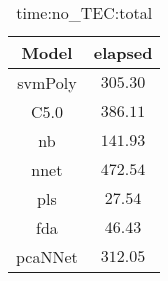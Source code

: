 \begin{table}[!ht]
	\centering
	\begin{tabular}{|c|c|}
		\hline
		Model & elapsed \\ \hline
		svmPoly & $305.30$ \\ \hline
		C5.0 & $386.11$ \\ \hline
		nb & $141.93$ \\ \hline
		nnet & $472.54$ \\ \hline
		pls & $27.54$ \\ \hline
		fda & $46.43$ \\ \hline
		pcaNNet & $312.05$ \\ \hline
	\end{tabular}
	\caption{time:no_TEC:total}
	\label{tab:time:no_TEC:total}
\end{table}
